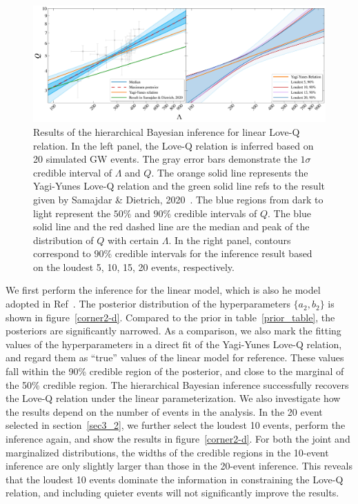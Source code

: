 \documentclass[a4paper,11pt]{article}
\begin{document}
\begin{figure}
\centering
\includegraphics[width=\textwidth]{hierarchical_results_AP4_2d.pdf}
    \caption{Results of the hierarchical Bayesian inference for linear Love-Q relation. In the left panel, the Love-Q relation is inferred based on 20 simulated GW events. The gray error bars demonstrate the $1\sigma$ credible interval of $\Lambda$ and $Q$. The orange solid line represents the Yagi-Yunes Love-Q relation and the green solid line refs to the result given by Samajdar \& Dietrich, 2020~\cite{Samajdar:2020xrd}. The blue regions from dark to light represent the $50\%$ and $90\%$ credible intervals of $Q$. The blue solid line and the red dashed line are the median and peak of the distribution of $Q$ with certain $\Lambda$. In the right panel, contours correspond to $90\%$ credible intervals for the inference result based on the loudest 5, 10, 15, 20 events, respectively.
    \label{2-d_Love_Q}}
\end{figure}
We first perform the inference for the linear model, which is also he  model adopted
in Ref~\cite{Samajdar:2020xrd}. The posterior distribution of the
hyperparameters $\{a_2,b_2\}$ is shown in figure~\ref{corner2-d}. Compared
to the prior in table~\ref{prior_table}, the posteriors are significantly
narrowed. As a
comparison, we also mark the fitting values of the hyperparameters
in a direct fit of the Yagi-Yunes
Love-Q relation, and regard them as ``true'' values of the linear model for reference. These values fall within the 90\% credible region of
the posterior, and close to the marginal of the 50\% credible region. 
 The hierarchical Bayesian inference successfully
 recovers the Love-Q
relation under the linear parameterization. We also investigate how the results
depend on the number of events in the analysis. In the 20 event selected in
section~\ref{sec3_2}, we further select the loudest 10 events, perform the
inference again, and show the results in figure~\ref{corner2-d}. For both the
joint and marginalized distributions, the widths of the credible regions in the
10-event inference are only slightly larger than those in the 20-event
inference. This reveals that the loudest 10 events dominate the information in
constraining the Love-Q relation, and including quieter events will not significantly improve the results.
\end{document}
